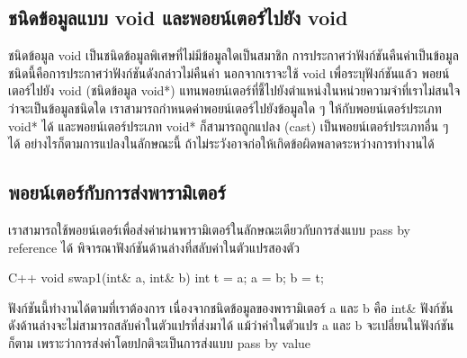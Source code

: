 \subsection{ชนิด{\wbr}ข้อมูล{\wbr}แบบ {\ct void} และ{\wbr}พอยน์เตอร์{\wbr}ไป{\wbr}ยัง {\ct void}}

ชนิด{\wbr}ข้อมูล {\ct void} เป็น{\wbr}ชนิด{\wbr}ข้อมูล{\wbr}พิเศษ{\wbr}ที่{\wbr}ไม่{\wbr}มี{\wbr}ข้อมูล{\wbr}ใด{\wbr}เป็น{\wbr}สมาชิก{\wbr}
การ{\wbr}ประกาศ{\wbr}ว่า{\wbr}ฟังก์ชัน{\wbr}คืน{\wbr}ค่า{\wbr}เป็น{\wbr}ข้อมูล{\wbr}ชนิด{\wbr}นี้{\wbr}คือ{\wbr}การ{\wbr}ประกาศ{\wbr}ว่า{\wbr}ฟังก์ชัน{\wbr}ดังกล่าว{\wbr}ไม่{\wbr}คืน{\wbr}ค่า{\wbr}
นอกจาก{\wbr}เรา{\wbr}จะ{\wbr}ใช้ {\ct void} เพื่อ{\wbr}ระบุ{\wbr}ฟังก์ชัน{\wbr}แล้ว พอยน์เตอร์ไป{\wbr}ยัง {\ct void}
(ชนิด{\wbr}ข้อมูล {\ct void*})
แทน{\wbr}พอยน์เตอร์{\wbr}ที่{\wbr}ชี้{\wbr}ไป{\wbr}ยัง{\wbr}ตำแหน่ง{\wbr}ใน{\wbr}หน่วยความจำ{\wbr}ที่{\wbr}เรา{\wbr}ไม่{\wbr}สนใจ{\wbr}ว่า{\wbr}จะ{\wbr}เป็น{\wbr}ข้อมูล{\wbr}ชนิด{\wbr}ใด{\wbr}
เรา{\wbr}สามารถ{\wbr}กำหนด{\wbr}ค่า{\wbr}พอยน์เตอร์{\wbr}ไป{\wbr}ยัง{\wbr}ข้อมูล{\wbr}ใด ๆ ให้{\wbr}กับ{\wbr}พอยน์เตอร์{\wbr}ประเภท {\ct void*} ได้{\wbr}
และ{\wbr}พอยน์เตอร์{\wbr}ประเภท {\ct void*} ก็{\wbr}สามารถ{\wbr}ถูก{\wbr}แปลง (cast) เป็น{\wbr}พอยน์เตอร์{\wbr}ประเภท{\wbr}อื่น{\wbr}
ๆ ได้ อย่างไรก็ตาม{\wbr}การ{\wbr}แปลง{\wbr}ใน{\wbr}ลักษณะ{\wbr}นี้{\wbr}
ถ้า{\wbr}ไม่{\wbr}ระวัง{\wbr}อาจ{\wbr}ก่อ{\wbr}ให้{\wbr}เกิด{\wbr}ข้อผิดพลาด{\wbr}ระหว่าง{\wbr}การ{\wbr}ทำงาน{\wbr}ได้{\wbr}


\subsection{พอยน์เตอร์กับ{\wbr}การ{\wbr}ส่ง{\wbr}พารามิเตอร์}
เรา{\wbr}สามารถ{\wbr}ใช้{\wbr}พอยน์เตอร์{\wbr}เพื่อ{\wbr}ส่ง{\wbr}ค่า{\wbr}ผ่าน{\wbr}พารามิเตอร์{\wbr}ใน{\wbr}ลักษณะ{\wbr}เดียวกับ{\wbr}การ{\wbr}ส่ง{\wbr}แบบ pass by
reference ได้ พิจารณา{\wbr}ฟังก์ชัน{\wbr}ด้าน{\wbr}ล่าง{\wbr}ที่{\wbr}สลับ{\wbr}ค่า{\wbr}ใน{\wbr}ตัวแปร{\wbr}สอง{\wbr}ตัว{\wbr}

\latintext
\begin{codelist}{C++}{}
void swap1(int& a, int& b)
{
  int t = a;
  a = b;
  b = t;
}
\end{codelist}
\thaitext

ฟังก์ชัน{\wbr}นี้{\wbr}ทำงาน{\wbr}ได้{\wbr}ตาม{\wbr}ที่{\wbr}เรา{\wbr}ต้องการ เนื่องจาก{\wbr}ชนิด{\wbr}ข้อมูล{\wbr}ของ{\wbr}พารามิเตอร์ {\ct a} และ {\ct
  b} คือ {\ct int\&} ฟังก์ชัน{\wbr}ดัง{\wbr}ด้าน{\wbr}ล่าง{\wbr}จะ{\wbr}ไม่{\wbr}สามารถ{\wbr}สลับ{\wbr}ค่า{\wbr}ใน{\wbr}ตัวแปร{\wbr}ที่{\wbr}ส่ง{\wbr}มา{\wbr}ได้{\wbr}
แม้ว่า{\wbr}ค่า{\wbr}ใน{\wbr}ตัวแปร {\ct a} และ {\ct b} จะ{\wbr}เปลี่ยน{\wbr}ใน{\wbr}ฟังก์ชัน{\wbr}ก็ตาม{\wbr}
เพราะว่า{\wbr}การ{\wbr}ส่ง{\wbr}ค่า{\wbr}โดย{\wbr}ปกติ{\wbr}จะ{\wbr}เป็น{\wbr}การ{\wbr}ส่ง{\wbr}แบบ pass by value

